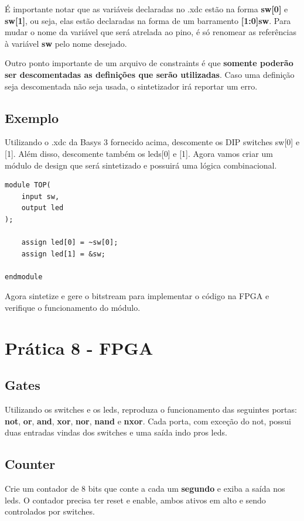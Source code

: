 \documentclass[a4paper]{article}
\begin{document}
É importante notar que as variáveis declaradas no .xdc estão na forma \textbf{sw[0]} e \textbf{sw[1]}, ou seja, elas estão declaradas na forma de um barramento \textbf{[1:0]sw}. Para mudar o nome da variável que será atrelada ao pino, é só renomear as referências à variável \textbf{sw} pelo nome desejado.

Outro ponto importante de um arquivo de constraints é que \textbf{somente poderão ser descomentadas as definições que serão utilizadas}. Caso uma definição seja descomentada não seja usada, o sintetizador irá reportar um erro.

\newpage

\subsection*{Exemplo}

Utilizando o .xdc da Basys 3 fornecido acima, descomente os DIP switches sw[0] e [1]. Além disso, descomente também os leds[0] e [1]. Agora vamos criar um módulo de design que será sintetizado e possuirá uma lógica combinacional.

\begin{lstlisting}[style={verilog-style}]
module TOP(
	input sw,
    output led
);

	assign led[0] = ~sw[0];
    assign led[1] = &sw;

endmodule
\end{lstlisting}

Agora sintetize e gere o bitstream para implementar o código na FPGA e verifique o funcionamento do módulo.

\section*{Prática 8 - FPGA}

\subsection*{Gates}
Utilizando os switches e os leds, reproduza o funcionamento das seguintes portas: \textbf{not},\textbf{ or}, \textbf{and}, \textbf{xor}, \textbf{nor}, \textbf{nand} e \textbf{nxor}. Cada porta, com exceção do not, possui duas entradas vindas dos switches e uma saída indo pros leds.

\subsection*{Counter}
Crie um contador de 8 bits que conte a cada um \textbf{segundo} e exiba a saída nos leds. O contador precisa ter reset e enable, ambos ativos em alto e sendo controlados por switches. 
\end{document}
